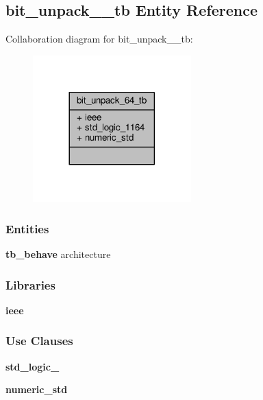 \subsection{bit\+\_\+unpack\+\_\+\_\+tb Entity Reference}
\label{classbit__unpack__64__tb}


Collaboration diagram for bit\+\_\+unpack\+\_\+\_\+tb\+:\nopagebreak
\begin{figure}[H]
\begin{center}
\leavevmode
\includegraphics[width=173pt]{d4/d0f/classbit__unpack__64__tb__coll__graph}
\end{center}
\end{figure}
\subsubsection*{Entities}
\begin{DoxyCompactItemize}
\item 
{\bf tb\+\_\+behave} architecture
\end{DoxyCompactItemize}
\subsubsection*{Libraries}
 \begin{DoxyCompactItemize}
\item 
{\bf ieee} 
\end{DoxyCompactItemize}
\subsubsection*{Use Clauses}
 \begin{DoxyCompactItemize}
\item 
{\bf std\+\_\+logic\+\_}   
\item 
{\bf numeric\+\_\+std}   
\end{DoxyCompactItemize}



